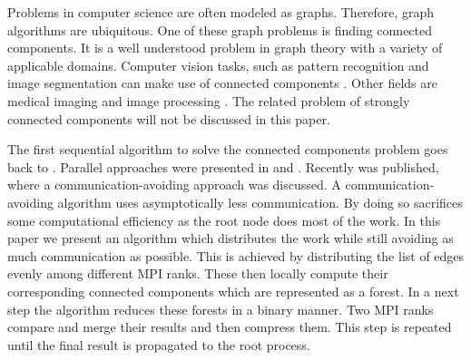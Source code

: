 

Problems in computer science are often modeled as graphs. Therefore, graph algorithms are ubiquitous. One of these graph problems is finding connected components. It is a well understood problem in graph theory with a variety of applicable domains. Computer vision tasks, such as pattern recognition and image segmentation \cite{683775} can make use of connected components \cite{Wilson:2006:RCV:1166253.1166292}. Other fields are medical imaging \cite{UDUPA1990355} and image processing \cite{Ambrosio2001}. The related problem of strongly connected components will not be discussed in this paper.

The first sequential algorithm to solve the connected components problem goes back to \cite{Hopcroft}. Parallel approaches were presented in \cite{MANOHAR1989133} and \cite{Han:1990:EFP:79147.214077}. Recently \cite{comm_avoiding} was published, where a communication-avoiding approach was discussed. A communication-avoiding algorithm uses asymptotically less communication. By doing so \cite{comm_avoiding} sacrifices some computational efficiency as the root node does most of the work. In this paper we present an algorithm which distributes the work while still avoiding as much communication as possible. This is achieved by distributing the list of edges evenly among different MPI ranks. These then locally compute their corresponding connected components which are represented as a forest. In a next step the algorithm reduces these forests in a binary manner. Two MPI ranks compare and merge their results and then compress them. This step is repeated until the final result is propagated to the root process.



